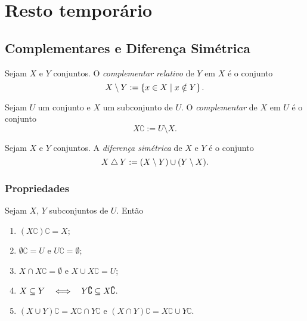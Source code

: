 \chapter{Resto temporário}

\section{Complementares e Diferença Simétrica}

\begin{defi}
Sejam $X$ e $Y$ conjuntos. O \emph{complementar relativo} de $Y$ em $X$ é o conjunto
	\begin{equation*}
	X \setminus Y := \left\{x \in X \;\middle\vert\; x \notin Y \right\}.
	\end{equation*}
\end{defi}

\begin{defi}
Sejam $U$ um conjunto e $X$ um subconjunto de $U$. O \emph{complementar} de $X$ em $U$ é o conjunto
	\begin{equation*}
	X\complement := U \setminus X.
	\end{equation*}
\end{defi}

\begin{defi}
Sejam $X$ e $Y$ conjuntos. A \emph{diferença simétrica} de $X$ e $Y$ é o conjunto
	\begin{equation*}
	X \mathbin{\triangle} Y := (X \setminus Y) \cup (Y \setminus X).
	\end{equation*}
\end{defi}

\subsection{Propriedades}

\begin{prop}
Sejam $X$, $Y$ subconjuntos de $U$. Então
	\begin{enumerate}
	\item $(X\complement)\complement = X$;
	\item $\emptyset\complement = U$ e $U\complement = \emptyset$;
	\item $X \cap X\complement = \emptyset$ e $X \cup X\complement = U$;
	\item $X \subseteq Y \quad \Longleftrightarrow \quad Y\complement \subseteq X\complement$.
	\item $(X \cup Y)\complement = X\complement \cap Y\complement$ e $(X \cap Y)\complement = X\complement \cup Y\complement$.
	\end{enumerate}
\end{prop}




